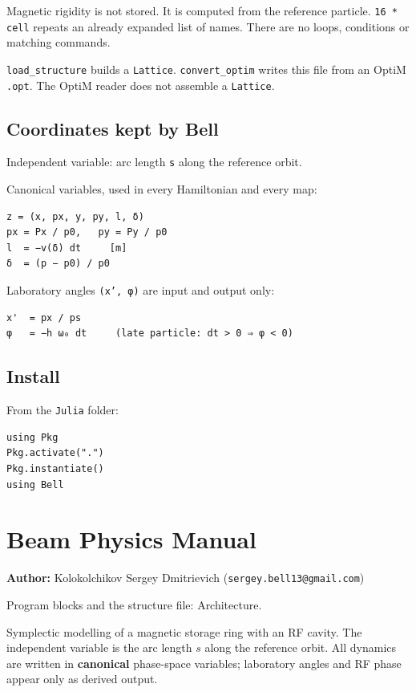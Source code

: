\documentclass[11pt,a4paper]{article}
\begin{document}
Magnetic rigidity is not stored. It is computed from the reference
particle. \texttt{16 * cell} repeats an already expanded list of names. There
are no loops, conditions or matching commands.

\texttt{load\_structure} builds a \texttt{Lattice}. \texttt{convert\_optim} writes this file
from an OptiM \texttt{.opt}. The OptiM reader does not assemble a \texttt{Lattice}.

\subsection{Coordinates kept by Bell}

Independent variable: arc length \texttt{s} along the reference orbit.

Canonical variables, used in every Hamiltonian and every map:

\begin{verbatim}
z = (x, px, y, py, l, δ)
px = Px / p0,   py = Py / p0
l  = −v(δ) dt     [m]
δ  = (p − p0) / p0
\end{verbatim}

Laboratory angles \texttt{(x', φ)} are input and output only:

\begin{verbatim}
x'  = px / ps
φ   = −h ω₀ dt     (late particle: dt > 0 ⇒ φ < 0)
\end{verbatim}

\subsection{Install}

From the \texttt{Julia} folder:

\begin{verbatim}
using Pkg
Pkg.activate(".")
Pkg.instantiate()
using Bell
\end{verbatim}

\clearpage
\section{Beam Physics Manual}

\textbf{Author:} Kolokolchikov Sergey Dmitrievich (\texttt{sergey.bell13@gmail.com})

Program blocks and the structure file: Architecture.

Symplectic modelling of a magnetic storage ring with an RF cavity.
The independent variable is the arc length $s$ along the reference orbit.
All dynamics are written in \textbf{canonical} phase-space variables; laboratory
angles and RF phase appear only as derived output.
\end{document}
